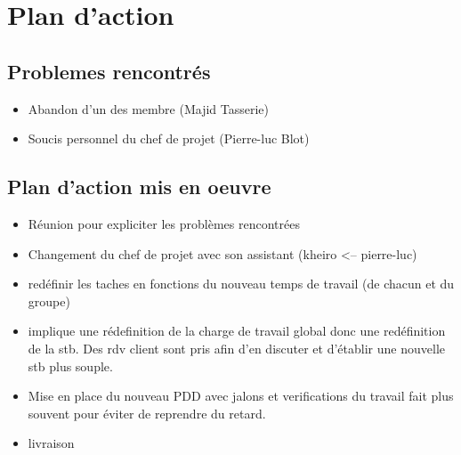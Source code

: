 \documentclass{../res/adr}
\begin{document}
    \section{Plan d'action}
        \subsection{Problemes rencontrés}
        \begin{itemize}
            \item Abandon d'un des membre (Majid Tasserie)
            \item Soucis personnel du chef de projet (Pierre-luc Blot)
            
        \end{itemize}

        \subsection{Plan d'action mis en oeuvre}
        \begin{itemize}
            \item Réunion pour expliciter les problèmes rencontrées
            \item Changement du chef de projet avec son assistant (kheiro <-- pierre-luc)
            \item redéfinir les taches en fonctions du nouveau temps de travail (de chacun et du groupe)
            \item implique une rédefinition de la charge de travail global donc une redéfinition de la stb. Des rdv client sont pris afin d'en discuter et d'établir une nouvelle stb plus souple.
            \item Mise en place du nouveau PDD avec jalons et verifications du travail fait plus souvent pour éviter de reprendre du retard.
            \item livraison
            
        \end{itemize}
\end{document}
